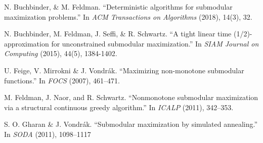 \documentclass{article}
\begin{document}

\begin{thebibliography}{99}
N. Buchbinder, \& M. Feldman. ``Deterministic algorithms for submodular maximization problems.'' In \emph{ACM Transactions on Algorithms} (2018), 14(3), 32.

N. Buchbinder, M. Feldman, J. Seffi, \& R. Schwartz. ``A tight linear time (1/2)-approximation for unconstrained submodular maximization.'' In \emph{SIAM Journal on Computing} (2015), 44(5), 1384-1402.

U. Feige, V. Mirrokni \& J. Vondr\'{a}k. ``Maximizing non-monotone submodular functions.'' In \emph{FOCS} (2007), 461–471.

M. Feldman, J. Naor, and R. Schwartz. ``Nonmonotone submodular maximization via a structural continuous greedy algorithm.'' In \emph{ICALP} (2011), 342–353.

S. O. Gharan \& J. Vondr\'{a}k. ``Submodular maximization by simulated annealing.'' In \emph{SODA} (2011), 1098–1117
\end{thebibliography}
\end{document}
